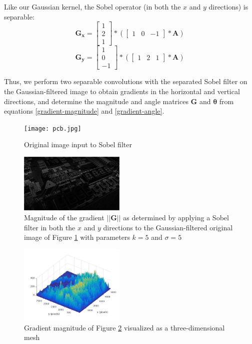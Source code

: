 \documentclass[journal]{IEEEtran}
\begin{document}
Like our Gaussian kernel, the Sobel operator (in both the $x$ and $y$ directions) is separable:
\begin{equation}
	\label{horizontal-sobel-filter}
	\boldsymbol{G_x} =
	\begin{bmatrix}
		1 \\
		2 \\
		1
	\end{bmatrix} * 
	(\begin{bmatrix}
		1 & 0 & -1
	\end{bmatrix} * \boldsymbol{A})
\end{equation}
\begin{equation}
	\label{vertical-sobel-filter}
	\boldsymbol{G_y} =
	\begin{bmatrix}
		1 \\
		0 \\
		-1
	\end{bmatrix} * 
	(\begin{bmatrix}
		1 & 2 & 1
	\end{bmatrix} * \boldsymbol{A})
\end{equation}
\par Thus, we perform two separable convolutions with the separated Sobel filter on the Gaussian-filtered image to obtain gradients in the horizontal and vertical directions, and determine the magnitude and angle matrices $\boldsymbol{G}$ and $\boldsymbol{\theta}$ from equations \eqref{gradient-magnitude} and \eqref{gradient-angle}.
\begin{figure}[h]
	\centering
	\texttt{[image: pcb.jpg]}
	\caption{Original image input to Sobel filter}
    \label{pcb-original}
\end{figure}
\begin{figure}[h]
	\centering
	\includegraphics[width=0.45\textwidth]{sobel_pcb.jpg}
	\caption{Magnitude of the gradient $||\boldsymbol{G}||$ as determined by applying a Sobel filter in both the $x$ and $y$ directions to the Gaussian-filtered original image of Figure \ref{pcb-original} with parameters $k = 5$ and $\sigma = 5$}
    \label{sobel-pcb}
\end{figure}
\begin{figure}[h]
	\centering
	\includegraphics[width=0.45\textwidth]{sobel_pcb_mesh.jpg}
	\caption{Gradient magnitude of Figure \ref{sobel-pcb} visualized as a three-dimensional mesh}
    \label{sobel-pcb-mesh}
\end{figure}
\end{document}
